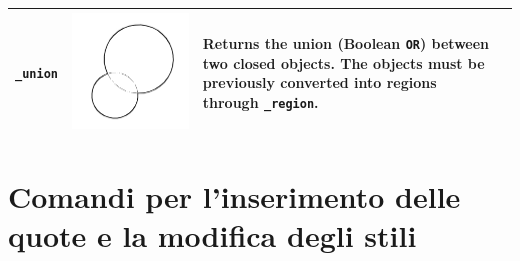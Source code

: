 \documentclass[..]{../IEEEphot}
\begin{document}
\begin{center}
\begin{longtable}{m{.2\linewidth}m{.2\linewidth}m{.25\linewidth}m{.25\linewidth}}
\texttt{\_union} & \includegraphics[width = 0.8\linewidth, keepaspectratio]{../images/jpg/_union.jpg} & Returns the union (Boolean \texttt{OR}) between two closed objects. The objects must be previously converted into regions through \texttt{\_region}. & 
\\
\bottomrule
\end{longtable}
\end{center}

\clearpage

\section{Comandi per l'inserimento delle quote e la modifica degli stili}
\end{document}
